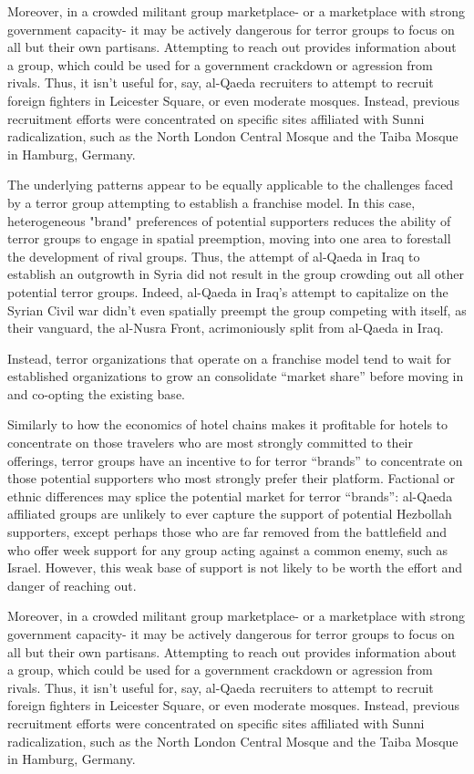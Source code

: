\documentclass{article}
\begin{document}
Moreover, in a crowded militant group marketplace- or a marketplace
with strong government capacity- it may be actively
dangerous for terror groups to focus on all but their own
partisans. Attempting to reach out provides information about a group,
which could be used for a government crackdown or  agression from
rivals. Thus, it isn't useful for, say, al-Qaeda recruiters to attempt to recruit
foreign fighters in Leicester Square, or even moderate mosques.
Instead, previous recruitment efforts were concentrated on specific
sites affiliated with Sunni radicalization, such as the North
London Central Mosque and the Taiba Mosque in Hamburg, Germany.


The underlying patterns appear to be equally applicable to the
challenges faced by a terror group attempting to establish a franchise
model. In this case, heterogeneous "brand" preferences of potential supporters
reduces the ability of terror groups to engage in spatial preemption,
moving into one area to forestall the development of rival
groups. Thus, the attempt of al-Qaeda in Iraq to establish an
outgrowth in Syria did not result in the group crowding out all other
potential terror groups. Indeed, al-Qaeda in Iraq's attempt to
capitalize on the Syrian Civil war didn't even spatially preempt the
group competing with itself, as their vanguard, the al-Nusra Front,
acrimoniously split from al-Qaeda in Iraq.

 Instead, terror organizations that operate on a franchise model tend
 to wait for established organizations to grow an consolidate ``market
 share'' before moving in and co-opting the existing base.

Similarly to how the economics of hotel chains makes it profitable for
hotels to concentrate on those travelers who are most strongly
committed to their offerings, terror groups have an incentive to for
terror ``brands'' to concentrate on those potential supporters who
most strongly prefer their platform. Factional or ethnic differences
may splice the potential market for terror ``brands'': al-Qaeda
affiliated groups are unlikely to ever capture the support of
potential Hezbollah supporters, except perhaps those who are far
removed from the battlefield and who offer week support for any group
acting against a common enemy, such as Israel. However, this weak base
of support is not likely to be worth the effort and danger of reaching
out. 

Moreover, in a crowded militant group marketplace- or a marketplace
with strong government capacity- it may be actively
dangerous for terror groups to focus on all but their own
partisans. Attempting to reach out provides information about a group,
which could be used for a government crackdown or  agression from
rivals. Thus, it isn't useful for, say, al-Qaeda recruiters to attempt to recruit
foreign fighters in Leicester Square, or even moderate mosques.
Instead, previous recruitment efforts were concentrated on specific
sites affiliated with Sunni radicalization, such as the North
London Central Mosque and the Taiba Mosque in Hamburg, Germany.
\end{document}
